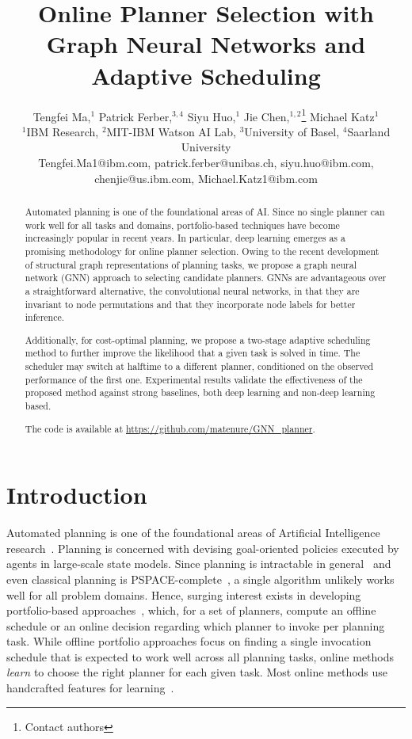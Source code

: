 \documentclass[letterpaper]{article} %
\title{Online Planner Selection with Graph Neural Networks and Adaptive Scheduling}
\author{
 Tengfei Ma,$^1$
 Patrick Ferber,$^{3,4}$
 Siyu Huo,$^1$
 Jie Chen,$^{1,2}$\thanks{Contact authors}
 Michael Katz$^1$\footnotemark[1]\\
 $^1$IBM Research,
 $^2$MIT-IBM Watson AI Lab,
 $^3$University of Basel,
 $^4$Saarland University\\
 Tengfei.Ma1@ibm.com,
 patrick.ferber@unibas.ch,
 siyu.huo@ibm.com,
 chenjie@us.ibm.com,
 Michael.Katz1@ibm.com
}
\begin{document}
\maketitle


\begin{abstract}
Automated planning is one of the foundational areas of AI. Since no
single planner can work well for all tasks and domains,
portfolio-based techniques have become increasingly popular in recent
years. In particular, deep learning emerges as a promising methodology
for online planner selection. Owing to the recent development of
structural graph representations of planning tasks, we propose a graph
neural network (GNN) approach to selecting candidate planners.  GNNs
are advantageous over a straightforward alternative, the convolutional
neural networks, in that they are invariant to node permutations and
that they incorporate node labels for better inference.

Additionally, for cost-optimal planning, we propose a two-stage
adaptive scheduling method to further improve the likelihood that a
given task is solved in time. The scheduler may switch at halftime to
a different planner, conditioned on the observed performance of the
first one. Experimental results validate the effectiveness of the
proposed method against strong baselines, both deep learning and
non-deep learning based.

The code is available at \url{https://github.com/matenure/GNN_planner}.
\end{abstract}


\section{Introduction}

Automated planning is one of the foundational areas of Artificial
Intelligence research~\cite{russell-norvig-1995}.
Planning is
concerned with devising goal-oriented policies executed by agents in
large-scale state models.  Since planning is intractable in
general~\cite{chapman-aij1987}
and even classical planning is
PSPACE-complete~\cite{bylander-aij1994},
a single algorithm unlikely
works well for all problem domains.  Hence, surging interest exists in
developing portfolio-based
approaches~\cite{seipp-et-al-icaps2012,vallati-miwai2012,howe-et-al-ecp1999,seipp-et-al-aaai2015},
which, for a set of planners, compute an offline schedule or an online
decision regarding which planner to invoke per planning task.  While
offline portfolio approaches focus on finding a single invocation
schedule that is expected to work well across all planning tasks,
online methods {\em learn} to choose the right planner for each given
task.  Most online methods use handcrafted features for
learning~\cite{cenamor-et-al-jair2016}.
\end{document}
